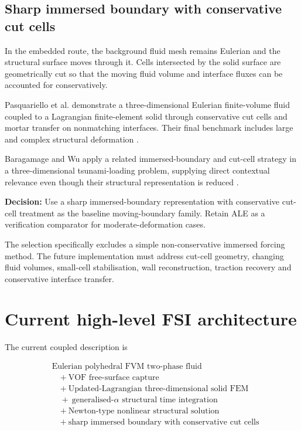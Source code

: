 \documentclass[11pt,a4paper]{article}
\newcommand{\decision}[1]{\textbf{Decision:} #1}
\begin{document}
\subsection{Sharp immersed boundary with conservative cut cells}
\label{subsec:cut-cell}

In the embedded route, the background fluid mesh remains Eulerian and the structural surface moves through it. Cells intersected by the solid surface are geometrically cut so that the moving fluid volume and interface fluxes can be accounted for conservatively.

Pasquariello et al. demonstrate a three-dimensional Eulerian finite-volume fluid coupled to a Lagrangian finite-element solid through conservative cut cells and mortar transfer on nonmatching interfaces. Their final benchmark includes large and complex structural deformation \autocite{pasquariello2016}.

Baragamage and Wu apply a related immersed-boundary and cut-cell strategy in a three-dimensional tsunami-loading problem, supplying direct contextual relevance even though their structural representation is reduced \autocite{baragamage2024}.

\decision{Use a sharp immersed-boundary representation with conservative cut-cell treatment as the baseline moving-boundary family. Retain ALE as a verification comparator for moderate-deformation cases.}

The selection specifically excludes a simple non-conservative immersed forcing method. The future implementation must address cut-cell geometry, changing fluid volumes, small-cell stabilisation, wall reconstruction, traction recovery and conservative interface transfer.

\section{Current high-level FSI architecture}
\label{sec:current-architecture}

The current coupled description is

\begin{align}
&\text{Eulerian polyhedral FVM two-phase fluid}
\nonumber\\
&\quad +\ \text{VOF free-surface capture}
\nonumber\\
&\quad +\ \text{Updated-Lagrangian three-dimensional solid FEM}
\nonumber\\
&\quad +\ \text{generalised-}\alpha\text{ structural time integration}
\nonumber\\
&\quad +\ \text{Newton-type nonlinear structural solution}
\nonumber\\
&\quad +\ \text{sharp immersed boundary with conservative cut cells}
\label{eq:current-fsi-architecture}
\end{align}
\end{document}
